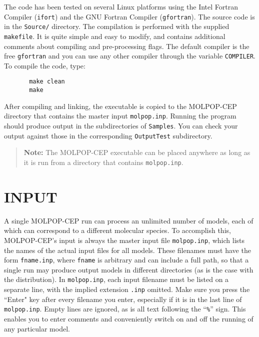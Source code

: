 \documentclass[12pt]{article}
\begin{document}
The code has been tested on several Linux platforms using the Intel Fortran
Compiler (\texttt{ifort}) and the GNU Fortran Compiler (\texttt{gfortran}). The
source code is in the \texttt{Source/} directory. The compilation is performed
with the supplied \texttt{makefile}. It is quite simple and easy to modify, and
contains additional comments about compiling and pre-processing flags. The
default compiler is the free \texttt{gfortran} and you can use any other
compiler through the variable \texttt{COMPILER}. To compile the code, type:
\begin{verbatim}
       make clean
       make
\end{verbatim}
After compiling and linking, the executable is copied to the MOLPOP-CEP
directory that contains the master input \texttt{molpop.inp}. Running the
program should produce output in the subdirectories of {\tt Samples}. You can
check your output against those in the corresponding {\tt OutputTest}
subdirectory.

\begin{quote}
{\bf Note:} The MOLPOP-CEP executable can be placed anywhere as long as it is
run from a directory that contains \texttt{molpop.inp}.
\end{quote}


\section{INPUT}


A single MOLPOP-CEP run can process an unlimited number of models, each of which
can correspond to a different molecular species. To accomplish this, MOLPOP-CEP's
input is always the master input file \texttt{molpop.inp}, which lists the names of the
actual input files for all models. These filenames must have the form
\texttt{fname.inp}, where \texttt{fname} is arbitrary and can include a full path, so that a
single run may produce output models in different directories (as is the case
with the distribution). In \texttt{molpop.inp}, each input filename must be listed on a
separate line, with the implied extension \texttt{.inp} omitted. Make sure you press the
``Enter" key after every filename you enter, especially if it is in the last
line of \texttt{molpop.inp}. Empty lines are ignored, as is all text following the ``\texttt{\%}''
sign. This enables you to enter comments and conveniently switch on
and off the running of any particular model.
\end{document}
